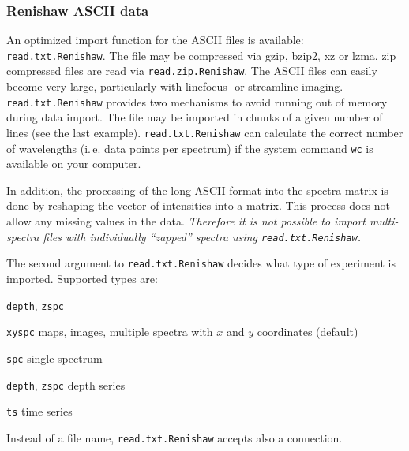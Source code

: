 \documentclass[english, a4paper, 10pt, headings=small, DIV11]{scrartcl}
\newcommand{\Rcode}[2][]{\texorpdfstring{\nohyphens{#1\texttt{#2}}}{#2}}
\newcommand{\Rfunction}[2][]{\texorpdfstring{\nohyphens{#1\texttt{#2}}}{#2}}
\newcommand{\ie}{i.\,e.\xspace}
\begin{document}
\subsubsection{Renishaw ASCII data}
\label{sec:read.txt.Renishaw}
%
An optimized import function for the ASCII files is available: \Rfunction{read.txt.Renishaw}. The
file may be compressed via gzip, bzip2, xz or lzma. zip compressed files are read via
\Rfunction{read.zip.Renishaw}.  The ASCII files can easily become very large, particularly with
linefocus- or streamline imaging.  \Rfunction{read.txt.Renishaw} provides two mechanisms to avoid
running out of memory during data import. The file may be imported in chunks of a given number of
lines (see the last example). \Rfunction{read.txt.Renishaw} can calculate the correct number of
wavelengths (\ie data points per spectrum) if the system command \texttt{wc} is available on your
computer.

In addition, the processing of the long ASCII format into the spectra matrix is done by reshaping the
vector of intensities into a matrix. This process does not allow any missing values in the data.
\emph{Therefore it is not possible to import multi-spectra files with individually ``zapped'' spectra
  using \Rfunction{read.txt.Renishaw}.}

The second argument to  \Rfunction{read.txt.Renishaw} decides what type of experiment is imported.
Supported types are:
\begin{labeling}{\Rcode{\textquotedbl depth\textquotedbl}, \Rcode{\textquotedbl zspc\textquotedbl}}
\item[\Rcode{\textquotedbl xyspc\textquotedbl}] maps, images, multiple spectra with $x$ and $y$
coordinates (default)
\item[\Rcode{\textquotedbl spc\textquotedbl}] single spectrum
\item[\Rcode{\textquotedbl depth\textquotedbl}, \Rcode{\textquotedbl zspc\textquotedbl}] depth series
\item[\Rcode{\textquotedbl ts\textquotedbl}] time series
\end{labeling}

Instead of a file name, \Rfunction{read.txt.Renishaw} accepts also a connection.
\end{document}

